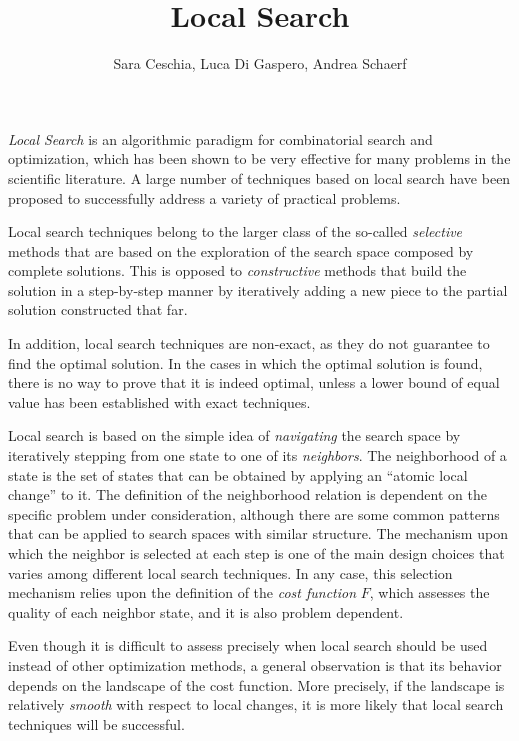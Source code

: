\title{Local Search}
\label{chp:local-search}
\author{Sara Ceschia, Luca Di Gaspero, Andrea Schaerf}
\maketitle


\emph{Local Search} is an algorithmic paradigm for combinatorial
search and optimization, which has been shown to be very effective for many
problems in the scientific literature. A large number
of techniques based on local search have been proposed to successfully
address a variety of practical problems.


Local search techniques belong to the larger class of the so-called
\emph{selective} methods that are based on the exploration of the
search space composed by complete solutions. This is opposed to
\emph{constructive} methods that build the solution in a step-by-step
manner by iteratively adding a new piece to the partial solution constructed
that far.  

In addition, local search techniques are non-exact, as they
do not guarantee to find the optimal solution. In the cases in which
the optimal solution is found, there is no way to prove that it is
indeed optimal, unless a lower bound of equal value has been established
with exact techniques.

Local search is based on the simple idea of \emph{navigating} the
search space by iteratively stepping from one state to one of its
\emph{neighbors}. The neighborhood of a state is the set of states
that can be obtained by applying an ``atomic local change'' to it. The
definition of the neighborhood relation is dependent on the specific
problem under consideration, although there are some common
patterns that can be applied to search spaces with
similar structure.  The mechanism upon which the neighbor is selected
at each step is one of the main design choices that varies
among different local search techniques. In any case, this selection
mechanism relies upon the definition of the \emph{cost function} $F$,
which assesses the quality of each neighbor state, and it is also
problem dependent.

Even though it is difficult to assess precisely when local search should be 
used instead of other optimization methods, a general observation is that 
its behavior depends on the landscape of the cost function. More precisely, if the 
landscape is relatively \emph{smooth} with respect to local 
changes, it is more likely that local search techniques will be successful.


